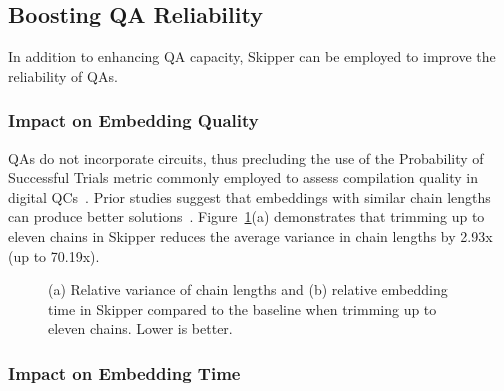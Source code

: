 \newpage 
\subsection{Boosting QA Reliability} \label{subsec:m1_reliability}
In addition to enhancing QA capacity, Skipper can be employed to improve the reliability of QAs. 


\subsubsection{Impact on Embedding Quality }

QAs do not incorporate circuits, thus precluding the use of the Probability of Successful Trials metric commonly employed to assess compilation quality in digital QCs~\cite{ayanzadeh2023frozenqubits, alam2020circuit, nishio, tannu2022hammer}.
Prior studies suggest that embeddings with similar chain lengths can produce better solutions~\cite{boothby2016fast,venturelli2015quantum,rieffel2015case,choi2008minor}.
Figure~\ref{fig:future_embedding_performance}(a) demonstrates that trimming up to eleven chains in Skipper reduces the average variance in chain lengths by 2.93x (up to 70.19x).


\begin{figure}[ht]
    \captionsetup[subfigure]{position=top} %
    \centering
    \caption{ 
(a) Relative variance of chain lengths and (b) relative embedding time in Skipper compared to the baseline when trimming up to eleven chains. 
Lower is better. 
}
    \label{fig:future_embedding_performance} 
\end{figure}  



\subsubsection{Impact on Embedding Time}

